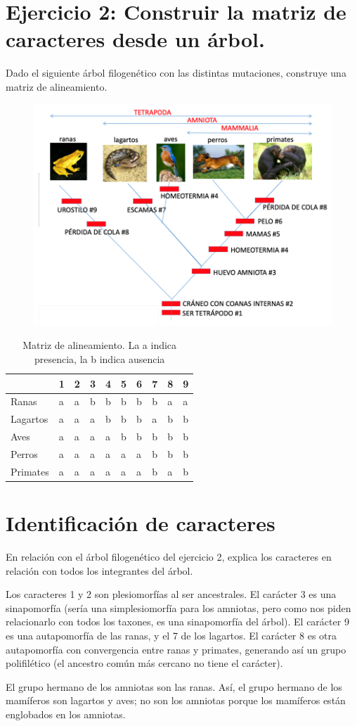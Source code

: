 \section{Ejercicio 2: Construir la matriz de caracteres desde un árbol.}
Dado el siguiente árbol filogenético con las distintas mutaciones, construye una matriz de alineamiento.
\begin{figure}[htbp]
\centering
\includegraphics[width=0.7\linewidth]{figs/ejercicio-2.png}
\end{figure}

\begin{table}[htbp]
\centering
\begin{tabular}{l | l l l l l l l l l }
\hline
& 1 & 2 & 3 & 4 & 5 & 6 & 7 & 8 & 9 \\
\hline
Ranas & a & a & b & b & b & b & b & a & a\\
Lagartos & a & a & a & b & b & b & a & b & b\\
Aves & a & a & a & a & b & b & b & b & b\\
Perros & a & a & a & a & a & a & b & b & b\\
Primates & a & a & a & a & a & a & b & a & b
\end{tabular}
\caption{Matriz de alineamiento. La a indica presencia, la b indica ausencia}
\end{table}

\section{Identificación de caracteres}
En relación con el árbol filogenético del ejercicio 2, explica los caracteres en relación con todos los integrantes del árbol.

Los caracteres 1 y 2 son plesiomorfías al ser ancestrales. El carácter 3 es una sinapomorfía (sería una simplesiomorfía para los amniotas, pero como nos piden relacionarlo con todos los taxones, es una sinapomorfía del árbol). El carácter 9 es una autapomorfía de las ranas, y el 7 de los lagartos. El carácter 8 es otra autapomorfía con convergencia entre ranas y primates, generando así un grupo polifilético (el ancestro común más cercano no tiene el carácter). 

El grupo hermano de los amniotas son las ranas. Así, el grupo hermano de los mamíferos son lagartos y aves; no son los amniotas porque los mamíferos están englobados en los amniotas.  
